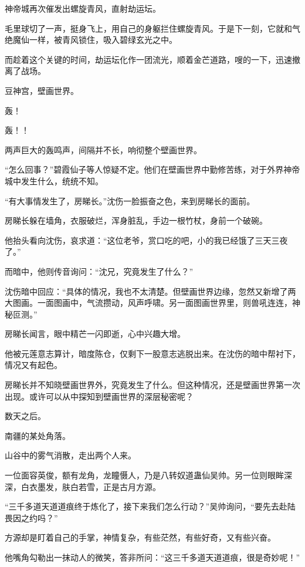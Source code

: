 \begin{this_body}
神帝城再次催发出螺旋青风，直射劫运坛。

毛里球切了一声，挺身飞上，用自己的身躯拦住螺旋青风。于是下一刻，它就和气绝魔仙一样，被青风锁住，吸入碧绿玄光之中。

而趁着这个关键的时间，劫运坛化作一团流光，顺着金芒道路，嗖的一下，迅速撤离了战场。

豆神宫，壁画世界。

轰！

轰！！

两声巨大的轰鸣声，间隔并不长，响彻整个壁画世界。

“怎么回事？”碧霞仙子等人惊疑不定。他们在壁画世界中勤修苦练，对于外界神帝城中发生什么，统统不知。

“有大事情发生了，房睇长。”沈伤一脸振奋之色，来到房睇长的面前。

房睇长躲在墙角，衣服破烂，浑身脏乱，手边一根竹杖，身前一个破碗。

他抬头看向沈伤，哀求道：“这位老爷，赏口吃的吧，小的我已经饿了三天三夜了。”

而暗中，他则传音询问：“沈兄，究竟发生了什么？”

沈伤暗中回应：“具体的情况，我也不太清楚。但壁画世界边缘，忽然又新增了两大图画。一面图画中，气流攒动，风声呼啸。另一面图画世界里，则兽吼连连，神秘叵测。”

房睇长闻言，眼中精芒一闪即逝，心中兴趣大增。

他被元莲意志算计，暗度陈仓，仅剩下一股意志逃脱出来。在沈伤的暗中帮衬下，情况又有起色。

房睇长并不知晓壁画世界外，究竟发生了什么。但这种情况，还是壁画世界第一次出现。或许可以从中探知到壁画世界的深层秘密呢？

数天之后。

南疆的某处角落。

山谷中的雾气消散，走出两个人来。

一位面容英俊，额有龙角，龙瞳慑人，乃是八转奴道蛊仙吴帅。另一位则眼眸深深，白衣墨发，肤白若雪，正是古月方源。

“三千多道天道道痕终于炼化了，接下来我们怎么行动？”吴帅询问，“要先去赴陆畏因之约吗？”

方源却是盯着自己的手掌，神情复杂，有些茫然，有些好奇，又有些兴奋。

他嘴角勾勒出一抹动人的微笑，答非所问：“这三千多道天道道痕，很是奇妙呢！”

\end{this_body}

